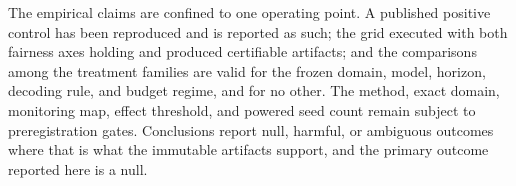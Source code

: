 The empirical claims are confined to one operating point. A published positive control has been reproduced and is reported as such; the grid executed with both fairness axes holding and produced certifiable artifacts; and the comparisons among the treatment families are valid for the frozen domain, model, horizon, decoding rule, and budget regime, and for no other. The method, exact domain, monitoring map, effect threshold, and powered seed count remain subject to preregistration gates. Conclusions report null, harmful, or ambiguous outcomes where that is what the immutable artifacts support, and the primary outcome reported here is a null.
